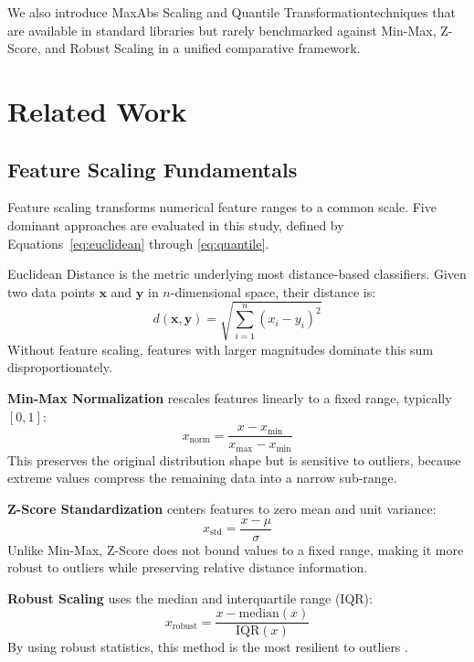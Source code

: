 \documentclass[12pt,a4paper]{article}
\begin{document}
We also introduce MaxAbs Scaling and Quantile Transformation\textemdash techniques that are available in standard libraries but rarely benchmarked against Min-Max, Z-Score, and Robust Scaling in a unified comparative framework.

\section{Related Work}
\label{sec:related}

\subsection{Feature Scaling Fundamentals}
\label{sec:fundamentals}

Feature scaling transforms numerical feature ranges to a common scale. Five dominant approaches are evaluated in this study, defined by Equations~\eqref{eq:euclidean} through \eqref{eq:quantile}.

Euclidean Distance is the metric underlying most distance-based classifiers. Given two data points $\mathbf{x}$ and $\mathbf{y}$ in $n$-dimensional space, their distance is:
\begin{equation}
  d(\mathbf{x}, \mathbf{y}) = \sqrt{\sum_{i=1}^{n} (x_i - y_i)^2}
  \label{eq:euclidean}
\end{equation}
Without feature scaling, features with larger magnitudes dominate this sum disproportionately.

\textbf{Min-Max Normalization} rescales features linearly to a fixed range, typically $[0, 1]$:
\begin{equation}
  x_{\text{norm}} = \frac{x - x_{\min}}{x_{\max} - x_{\min}}
  \label{eq:minmax}
\end{equation}
This preserves the original distribution shape but is sensitive to outliers, because extreme values compress the remaining data into a narrow sub-range.

\textbf{Z-Score Standardization} centers features to zero mean and unit variance:
\begin{equation}
  x_{\text{std}} = \frac{x - \mu}{\sigma}
  \label{eq:zscore}
\end{equation}
Unlike Min-Max, Z-Score does not bound values to a fixed range, making it more robust to outliers while preserving relative distance information.

\textbf{Robust Scaling} uses the median and interquartile range (IQR):
\begin{equation}
  x_{\text{robust}} = \frac{x - \text{median}(x)}{\text{IQR}(x)}
  \label{eq:robust}
\end{equation}
By using robust statistics, this method is the most resilient to outliers \cite{templ2023robust}.
\end{document}
